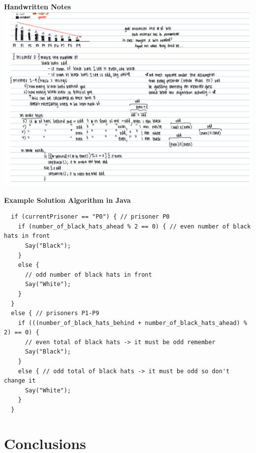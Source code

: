 \documentclass{article}
\theoremstyle{theorem}
\theoremstyle{definition}
\theoremstyle{remark}
\begin{document}
\begin{samepage}
  \begin{center}
    \textbf{Handwritten Notes}\\
    \includegraphics[width=18cm]{prisoner_hat_notes.png}\\
  \end{center}
\end{samepage}

\begin{center}
  \textbf{Example Solution Algorithm in Java}\\
\end{center}
\begin{verbatim}
  if (currentPrisoner == "P0") { // prisoner P0
    if (number_of_black_hats_ahead % 2 == 0) { // even number of black hats in front 
      Say("Black");
    }
    else { 
      // odd number of black hats in front
      Say("White");
    }
  }
  else { // prisoners P1-P9
    if (((number_of_black_hats_behind + number_of_black_hats_ahead) % 2) == 0) { 
      // even total of black hats -> it must be odd remember
      Say("Black");
    }
    else { // odd total of black hats -> it must be odd so don't change it
      Say("White");
    }
  }
\end{verbatim}


\section{Conclusions}\label{conclusions}
\end{document}
